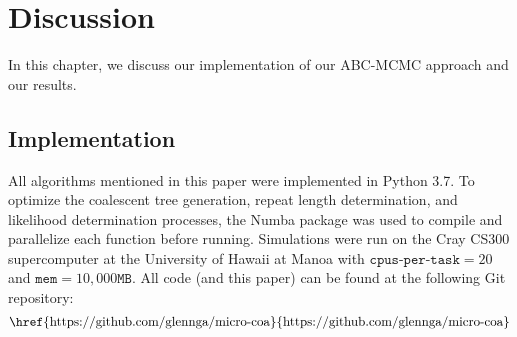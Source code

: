 \chapter{Discussion}\label{ch:discussion}
In this chapter, we discuss our implementation of our ABC-MCMC approach and our results.

\section{Implementation}\label{sec:implementation}
All algorithms mentioned in this paper were implemented in Python 3.7.
To optimize the coalescent tree generation, repeat length determination, and likelihood determination processes, the
Numba package was used to compile and parallelize each function before running.
Simulations were run on the Cray CS300 supercomputer at the University of Hawaii at Manoa with
$\texttt{cpus-per-task} = 20$ and $\texttt{mem}=10,000\texttt{MB}$.
All code (and this paper) can be found at the following Git repository:
\begin{equation*}
    \text{\href{https://github.com/glennga/micro-coa}{https://github.com/glennga/micro-coa}}
\end{equation*}

